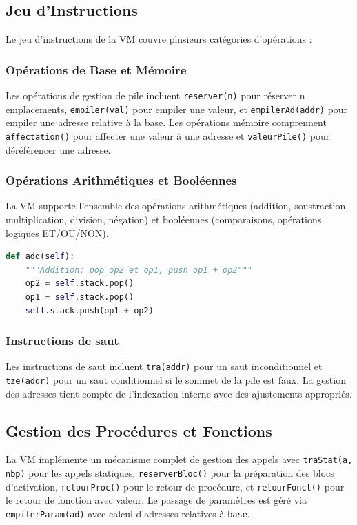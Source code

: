 \documentclass[a4paper, 12pt]{article}
\begin{document}
    \subsection{Jeu d'Instructions}

    Le jeu d'instructions de la VM couvre plusieurs catégories d'opérations :

    \subsubsection{Opérations de Base et Mémoire}
    Les opérations de gestion de pile incluent \texttt{reserver(n)} pour réserver n emplacements, \texttt{empiler(val)} pour empiler une valeur, et \texttt{empilerAd(addr)} pour empiler une adresse relative à la base. Les opérations mémoire comprennent \texttt{affectation()} pour affecter une valeur à une adresse et \texttt{valeurPile()} pour déréférencer une adresse.

    \subsubsection{Opérations Arithmétiques et Booléennes}
    La VM supporte l'ensemble des opérations arithmétiques (addition, soustraction, multiplication, division, négation) et booléennes (comparaisons, opérations logiques ET/OU/NON).

    \begin{lstlisting}[caption=Exemple d'opération arithmétique,language=python, xleftmargin=20pt]
def add(self):
    """Addition: pop op2 et op1, push op1 + op2"""
    op2 = self.stack.pop()
    op1 = self.stack.pop()
    self.stack.push(op1 + op2) \end{lstlisting}

    \subsubsection{Instructions de saut}
    Les instructions de saut incluent \texttt{tra(addr)} pour un saut inconditionnel et \texttt{tze(addr)} pour un saut conditionnel si le sommet de la pile est faux. La gestion des adresses tient compte de l'indexation interne avec des ajustements appropriés.

    \subsection{Gestion des Procédures et Fonctions}

    La VM implémente un mécanisme complet de gestion des appels avec \texttt{traStat(a, nbp)} pour les appels statiques, \texttt{reserverBloc()} pour la préparation des blocs d'activation, \texttt{retourProc()} pour le retour de procédure, et \texttt{retourFonct()} pour le retour de fonction avec valeur. Le passage de paramètres est géré via \texttt{empilerParam(ad)} avec calcul d'adresses relatives à \texttt{base}.
\end{document}
